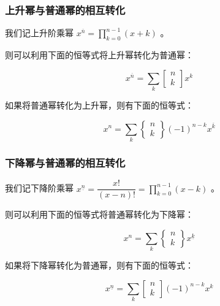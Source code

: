 \subsubsection{上升幂与普通幂的相互转化}

我们记上升阶乘幂 $x^{\overline{n}}=\prod_{k=0}^{n-1} (x+k)$ 。

则可以利用下面的恒等式将上升幂转化为普通幂：

$$
x^{\overline{n}}=\sum_{k} \begin{bmatrix}n\\ k\end{bmatrix} x^k
$$

如果将普通幂转化为上升幂，则有下面的恒等式：

$$
x^n=\sum_{k} \begin{Bmatrix}n\\ k\end{Bmatrix} (-1)^{n-k} x^{\overline{k}}
$$

\subsubsection{下降幂与普通幂的相互转化}

我们记下降阶乘幂 $x^{\underline{n}}=\dfrac{x!}{(x-n)!}=\prod_{k=0}^{n-1} (x-k)$ 。

则可以利用下面的恒等式将普通幂转化为下降幂：

$$
x^n=\sum_{k} \begin{Bmatrix}n\\ k\end{Bmatrix} x^{\underline{k}}
$$

如果将下降幂转化为普通幂，则有下面的恒等式：

$$
x^{\underline{n}}=\sum_{k} \begin{bmatrix}n\\ k\end{bmatrix} (-1)^{n-k} x^k
$$